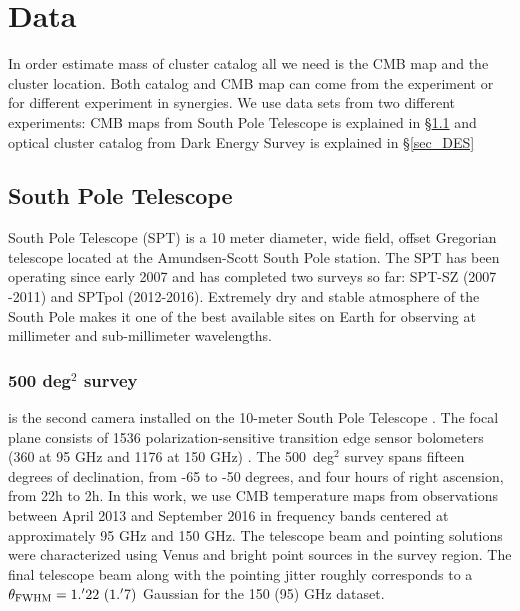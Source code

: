 \section{Data}
\label{sec_data}
In order estimate mass of cluster catalog all we need is the CMB map and the cluster location.
 Both catalog and CMB map can come from the experiment or for different experiment in synergies. 
We use data sets from two different experiments: CMB maps from South Pole Telescope is explained in \S\ref{sec_SPT} and 
optical cluster catalog from Dark Energy Survey is explained in \S\ref{sec_DES}

\subsection{South Pole Telescope}
\label{sec_SPT}
South Pole Telescope (SPT) is a 10 meter diameter, wide field, offset Gregorian telescope \citep[SPT,][]{padin08, carlstrom11} located at the Amundsen-Scott South Pole station.
The SPT has been operating since early 2007 and has completed two surveys so far: SPT-SZ (2007 -2011) and SPTpol (2012-2016).  
Extremely dry and stable atmosphere of the South Pole makes it one of the best available sites on Earth for observing at millimeter and sub-millimeter wavelengths. 

\subsubsection*{\sptpol{} {\rm 500} deg$^{2}$ survey}\label{sec_sptpol}
\sptpol{} is the second camera installed on the \mbox{10-meter} South Pole Telescope \citep[SPT,][]{padin08, carlstrom11}.
The \sptpol{} focal plane consists of 1536 polarization-sensitive transition edge sensor bolometers (360 at 95 GHz and 1176 at 150 GHz) \citep{austermann12}.
The \sptpol{} 500~deg$^{2}$ survey spans fifteen degrees of declination, from -65 to -50 degrees, and four hours of right ascension, from 22h to 2h. 
In this work, we use CMB temperature maps from observations between April 2013 and September 2016 in frequency bands centered at approximately 95 GHz and 150 GHz. 
The telescope beam and pointing solutions were characterized using Venus and bright point sources in the \sptpol{} survey region. 
The final telescope beam along with the pointing jitter roughly corresponds to a $\theta_{\rm FWHM} = 1.^{\prime}22\ (1.^{\prime}7)$ Gaussian for the 150 (95) GHz dataset.

